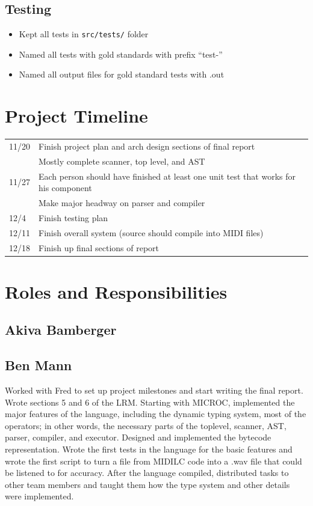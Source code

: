 \documentclass[12pt,A4]{book}
\begin{document}
\subsection{Testing}
\begin{itemize}
\item Kept all tests in \verb|src/tests/| folder
\item Named all tests with gold standards with prefix ``test-''
\item Named all output files for gold standard tests with .out
\end{itemize}
\section{Project Timeline}
\begin{tabular}{l p{}}
11/20 & Finish project plan and arch design sections of final report\\
      & Mostly complete scanner, top level, and AST\\
11/27 & Each person should have finished at least one unit test that works for his component\\
      & Make major headway on parser and compiler\\
12/4 & Finish testing plan\\
12/11 & Finish overall system (source should compile into MIDI files)\\
12/18 & Finish up final sections of report\\
\end{tabular}
\section{Roles and Responsibilities}
\subsection{Akiva Bamberger}
\subsection{Ben Mann}
Worked with Fred to set up project milestones and start writing the final report.  Wrote sections 5 and 6 of the LRM.  Starting with MICROC, implemented the major features of the language, including the dynamic typing system, most of the operators; in other words, the necessary parts of the toplevel, scanner, AST, parser, compiler, and executor.  Designed and implemented the bytecode representation.  Wrote the first tests in the language for the basic features and wrote the first script to turn a file from MIDILC code into a .wav file that could be listened to for accuracy.  After the language compiled, distributed tasks to other team members and taught them how the type system and other details were implemented.
\end{document}
